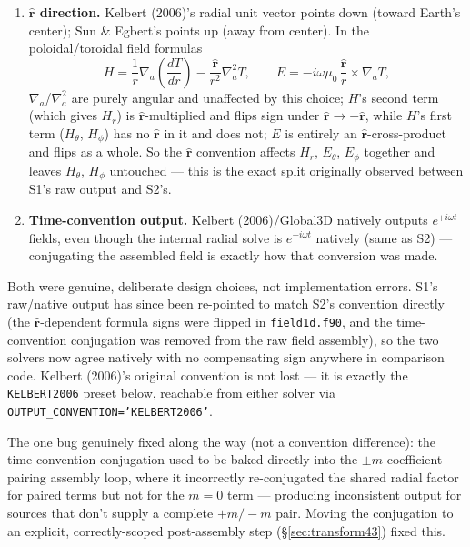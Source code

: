 \documentclass[11pt]{article}
\newcommand{\rhat}{\hat{\mathbf r}}
\begin{document}
\begin{enumerate}
\item \textbf{$\rhat$ direction.} Kelbert (2006)'s radial unit vector points down (toward Earth's
center); Sun \& Egbert's points up (away from center). In the poloidal/toroidal field formulas
\begin{equation}
H = \frac{1}{r}\nabla_a\!\left(\frac{dT}{dr}\right) - \frac{\rhat}{r^2}\nabla_a^2 T,
\qquad
E = -i\omega\mu_0\,\frac{\rhat}{r}\times\nabla_a T,
\end{equation}
$\nabla_a$/$\nabla_a^2$ are purely angular and unaffected by this choice; $H$'s second term (which
gives $H_r$) is $\rhat$-multiplied and flips sign under $\rhat\to-\rhat$, while $H$'s first term
($H_\theta$, $H_\phi$) has no $\rhat$ in it and does not; $E$ is entirely an
$\rhat$-cross-product and flips as a whole. So the $\rhat$ convention affects $H_r$, $E_\theta$,
$E_\phi$ together and leaves $H_\theta$, $H_\phi$ untouched --- this is the exact split originally
observed between S1's raw output and S2's.
\item \textbf{Time-convention output.} Kelbert (2006)/Global3D natively outputs $e^{+i\omega t}$
fields, even though the internal radial solve is $e^{-i\omega t}$ natively (same as S2) ---
conjugating the assembled field is exactly how that conversion was made.
\end{enumerate}

Both were genuine, deliberate design choices, not implementation errors. S1's raw/native output
has since been re-pointed to match S2's convention directly (the $\rhat$-dependent formula signs
were flipped in \texttt{field1d.f90}, and the time-convention conjugation was removed from the raw
field assembly), so the two solvers now agree natively with no compensating sign anywhere in
comparison code. Kelbert (2006)'s original convention is not lost --- it is exactly the
\texttt{KELBERT2006} preset below, reachable from either solver via
\texttt{OUTPUT\_CONVENTION='KELBERT2006'}.

The one bug genuinely fixed along the way (not a convention difference): the time-convention
conjugation used to be baked directly into the $\pm m$ coefficient-pairing assembly loop, where it
incorrectly re-conjugated the shared radial factor for paired terms but not for the $m=0$ term ---
producing inconsistent output for sources that don't supply a complete $+m/-m$ pair. Moving the
conjugation to an explicit, correctly-scoped post-assembly step (\S\ref{sec:transform43}) fixed
this.
\end{document}
